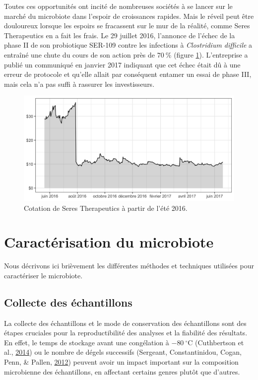 \documentclass[12pt,a4paper]{reedthesis}
\theoremstyle{definition}
\theoremstyle{definition}
\theoremstyle{definition}
\theoremstyle{remark}
\begin{document}
Toutes ces opportunités ont incité de nombreuses sociétés à se lancer sur le marché du microbiote dans l'espoir de croissances rapides. Mais le réveil peut être douloureux lorsque les espoirs se fracassent sur le mur de la réalité, comme Seres Therapeutics en a fait les frais. Le 29 juillet 2016, l'annonce de l'échec de la phase II de son probiotique SER-109 contre les infections à \emph{Clostridium difficile} a entraîné une chute du cours de son action près de \(70~\%\) (figure \ref{fig:seres}). L'entreprise a publié un communiqué en janvier 2017 indiquant que cet échec était dû à une erreur de protocole et qu'elle allait par conséquent entamer un essai de phase III, mais cela n'a pas suffi à rassurer les investisseurs.


\begin{figure}

{\centering \includegraphics[width=0.9\linewidth]{img/seres} 

}

\caption{Cotation de Seres Therapeutics à partir de l'été 2016.}\label{fig:seres}
\end{figure}
\hypertarget{caracterisation}{%
\section{Caractérisation du microbiote}\label{caracterisation}}

Nous décrivons ici brièvement les différentes méthodes et techniques utilisées pour caractériser le microbiote.

\hypertarget{collecte-des-uxe9chantillons}{%
\subsection{Collecte des échantillons}\label{collecte-des-uxe9chantillons}}

La collecte des échantillons et le mode de conservation des échantillons sont des étapes cruciales pour la reproductibilité des analyses et la fiabilité des résultats. En effet, le temps de stockage avant une congélation à \(-80~^\circ\text{C}\) (Cuthbertson et al., \protect\hyperlink{ref-cuthbertson2014time}{2014}) ou le nombre de dégels successifs (Sergeant, Constantinidou, Cogan, Penn, \& Pallen, \protect\hyperlink{ref-sergeant2012high}{2012}) peuvent avoir un impact important sur la composition microbienne des échantillons, en affectant certains genres plutôt que d'autres.
\end{document}
